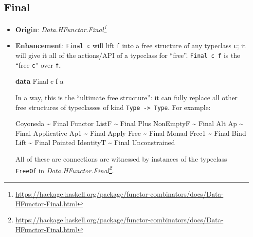 \documentclass[]{article}
\newenvironment{Shaded}{}{}
\newcommand{\DataTypeTok}[1]{\textcolor[rgb]{0.56,0.13,0.00}{#1}}
\newcommand{\KeywordTok}[1]{\textcolor[rgb]{0.00,0.44,0.13}{\textbf{#1}}}
\newcommand{\NormalTok}[1]{#1}
\newcommand{\OperatorTok}[1]{\textcolor[rgb]{0.40,0.40,0.40}{#1}}
\renewcommand{\href}[2]{#2\footnote{\url{#1}}}
\begin{document}
\hypertarget{final}{%
\subsection{Final}\label{final}}

\begin{itemize}
\item
  \textbf{Origin}:
  \emph{\href{https://hackage.haskell.org/package/functor-combinators/docs/Data-HFunctor-Final.html}{Data.HFunctor.Final}}
\item
  \textbf{Enhancement}: \texttt{Final\ c} will lift \texttt{f} into a free
  structure of any typeclass \texttt{c}; it will give it all of the actions/API
  of a typeclass for ``free''. \texttt{Final\ c\ f} is the ``free \texttt{c}''
  over \texttt{f}.

\begin{Shaded}
\begin{Highlighting}[]
\KeywordTok{data} \DataTypeTok{Final}\NormalTok{ c f a}
\end{Highlighting}
\end{Shaded}

  In a way, this is the ``ultimate free structure'': it can fully replace all
  other free structures of typeclasses of kind
  \texttt{Type\ -\textgreater{}\ Type}. For example:

\begin{Shaded}
\begin{Highlighting}[]
\DataTypeTok{Coyoneda}  \OperatorTok{\textasciitilde{}} \DataTypeTok{Final} \DataTypeTok{Functor}
\DataTypeTok{ListF}     \OperatorTok{\textasciitilde{}} \DataTypeTok{Final} \DataTypeTok{Plus}
\DataTypeTok{NonEmptyF} \OperatorTok{\textasciitilde{}} \DataTypeTok{Final} \DataTypeTok{Alt}
\DataTypeTok{Ap}        \OperatorTok{\textasciitilde{}} \DataTypeTok{Final} \DataTypeTok{Applicative}
\DataTypeTok{Ap1}       \OperatorTok{\textasciitilde{}} \DataTypeTok{Final} \DataTypeTok{Apply}
\DataTypeTok{Free}      \OperatorTok{\textasciitilde{}} \DataTypeTok{Final} \DataTypeTok{Monad}
\DataTypeTok{Free1}     \OperatorTok{\textasciitilde{}} \DataTypeTok{Final} \DataTypeTok{Bind}
\DataTypeTok{Lift}      \OperatorTok{\textasciitilde{}} \DataTypeTok{Final} \DataTypeTok{Pointed}
\DataTypeTok{IdentityT} \OperatorTok{\textasciitilde{}} \DataTypeTok{Final} \DataTypeTok{Unconstrained}
\end{Highlighting}
\end{Shaded}

  All of these are connections are witnessed by instances of the typeclass
  \texttt{FreeOf} in
  \emph{\href{https://hackage.haskell.org/package/functor-combinators/docs/Data-HFunctor-Final.html}{Data.HFunctor.Final}}.


\end{itemize}
\end{document}
